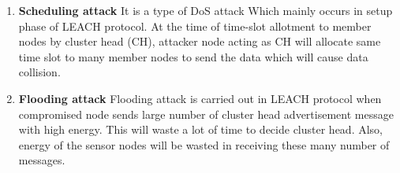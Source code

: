 \begin{enumerate}[label=\textbf{\roman*}]
    \item \textbf{Scheduling attack }\cite{almomani2015performance} It is a type of DoS attack Which mainly occurs in setup phase of LEACH protocol. At the time of time-slot allotment to member nodes by cluster head (CH), attacker node acting as CH will allocate same time slot to many member nodes to send the data which will cause data collision.
    
    \item \textbf{Flooding attack }\cite{almomani2015performance} Flooding attack is carried out in LEACH protocol when compromised node sends large number of cluster head advertisement message with high energy. This will waste a lot of time to decide cluster head. Also, energy of the sensor nodes will be wasted in receiving these many number of messages.
\end{enumerate}

